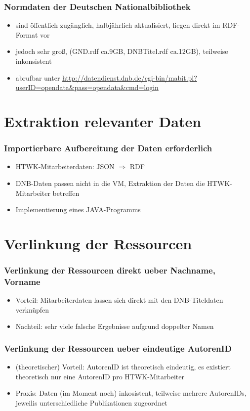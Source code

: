 \documentclass{beamer}
\begin{document}
\begin{frame}\frametitle{Normdaten der Deutschen Nationalbibliothek} 
\begin{itemize}
\item sind öffentlich zugänglich, halbjährlich aktualisiert, liegen direkt im RDF-Format vor
\item jedoch sehr groß, (GND.rdf ca.9GB, DNBTitel.rdf ca.12GB), teilweise inkonsistent
\item abrufbar unter \url{http://datendienst.dnb.de/cgi-bin/mabit.pl?userID=opendata&pass=opendata&cmd=login}
\end{itemize}
\end{frame}


\section{Extraktion relevanter Daten}
\begin{frame}\frametitle{Importierbare Aufbereitung der Daten erforderlich} 
\begin{itemize}
\item HTWK-Mitarbeiterdaten: JSON $\Rightarrow$ RDF
\item DNB-Daten passen nicht in die VM, Extraktion der Daten die HTWK-Mitarbeiter betreffen
\item Implementierung eines JAVA-Programms
\end{itemize}
\end{frame}



\section{Verlinkung der Ressourcen}

\begin{frame}\frametitle{Verlinkung der Ressourcen direkt ueber Nachname, Vorname} 
\begin{itemize}
\item Vorteil: Mitarbeiterdaten lassen sich direkt mit den DNB-Titeldaten verknüpfen
\item Nachteil: sehr viele falsche Ergebnisse aufgrund doppelter Namen
\end{itemize}
\end{frame}

\begin{frame}\frametitle{Verlinkung der Ressourcen ueber eindeutige AutorenID} 
\begin{itemize}
\item (theoretischer) Vorteil: AutorenID ist theoretisch eindeutig, es existiert theoretisch nur eine AutorenID pro HTWK-Mitarbeiter
\item Praxis: Daten (im Moment noch) inkosistent, teilweise mehrere AutorenIDs, jeweilis unterschiedliche Publikationen zugeordnet
\end{itemize}
\end{frame}
\end{document}
